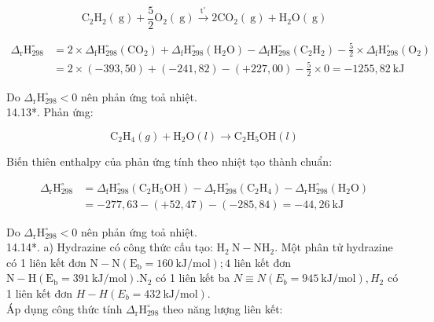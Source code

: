 \documentclass[10pt]{article}
\begin{document}
$$
\mathrm{C}_{2} \mathrm{H}_{2}(\mathrm{~g})+\frac{5}{2} \mathrm{O}_{2}(\mathrm{~g}) \xrightarrow{\mathrm{t}^{\circ}} 2 \mathrm{CO}_{2}(\mathrm{~g})+\mathrm{H}_{2} \mathrm{O}(\mathrm{~g})
$$

$$
\begin{aligned}
\Delta_{\mathrm{r}} \mathrm{H}_{298}^{\circ} & =2 \times \Delta_{\mathrm{f}} \mathrm{H}_{298}^{\circ}\left(\mathrm{CO}_{2}\right)+\Delta_{\mathrm{f}} \mathrm{H}_{298}^{\circ}\left(\mathrm{H}_{2} \mathrm{O}\right)-\Delta_{\mathrm{f}} \mathrm{H}_{298}^{\circ}\left(\mathrm{C}_{2} \mathrm{H}_{2}\right)-\frac{5}{2} \times \Delta_{\mathrm{f}} \mathrm{H}_{298}^{\circ}\left(\mathrm{O}_{2}\right) \\
& =2 \times(-393,50)+(-241,82)-(+227,00)-\frac{5}{2} \times 0=-1255,82 \mathrm{~kJ}
\end{aligned}
$$

Do $\Delta_{\mathrm{r}} \mathrm{H}_{298}^{\circ}<0$ nên phản ứng toả nhiệt.\\
14.13*. Phản ứng:

$$
\mathrm{C}_{2} \mathrm{H}_{4}(g)+\mathrm{H}_{2} \mathrm{O}(l) \rightarrow \mathrm{C}_{2} \mathrm{H}_{5} \mathrm{OH}(l)
$$

Biến thiên enthalpy của phản ứng tính theo nhiệt tạo thành chuẩn:

$$
\begin{aligned}
\Delta_{\mathrm{r}} \mathrm{H}_{298}^{\circ} & =\Delta_{\mathrm{f}} \mathrm{H}_{298}^{\circ}\left(\mathrm{C}_{2} \mathrm{H}_{5} \mathrm{OH}\right)-\Delta_{\mathrm{r}} \mathrm{H}_{298}^{\circ}\left(\mathrm{C}_{2} \mathrm{H}_{4}\right)-\Delta_{\mathrm{r}} \mathrm{H}_{298}^{\circ}\left(\mathrm{H}_{2} \mathrm{O}\right) \\
& =-277,63-(+52,47)-(-285,84)=-44,26 \mathrm{~kJ}
\end{aligned}
$$

Do $\Delta_{\mathrm{r}} \mathrm{H}_{298}^{\circ}<0$ nên phản ứng toả nhiệt.\\
14.14*. a) Hydrazine có công thức cấu tạo: $\mathrm{H}_{2} \mathrm{~N}-\mathrm{NH}_{2}$. Một phân tử hydrazine có 1 liên kết đơn $\mathrm{N}-\mathrm{N}\left(\mathrm{E}_{\mathrm{b}}=160 \mathrm{~kJ} / \mathrm{mol}\right) ; 4$ liên kết đơn $\mathrm{N}-\mathrm{H}\left(\mathrm{E}_{\mathrm{b}}=391 \mathrm{~kJ} / \mathrm{mol}\right) . \mathrm{N}_{2}$ có 1 liên kết ba $N \equiv N\left(E_{b}=945 \mathrm{~kJ} / \mathrm{mol}\right), H_{2}$ có 1 liên kết đơn $H-H\left(E_{b}=432 \mathrm{~kJ} / \mathrm{mol}\right)$.\\
Áp dụng công thức tính $\Delta_{\mathrm{r}} \mathrm{H}_{298}^{\circ}$ theo năng lượng liên kết:
\end{document}
